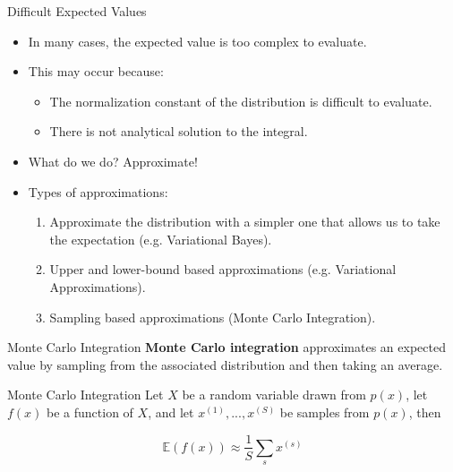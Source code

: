 \documentclass[serif,xcolor=pdftex,dvipsnames,table,hyperref={bookmarks=false,breaklinks}]{beamer}
\begin{document}
\begin{frame}[t]{Difficult Expected Values}
	\begin{itemize}[<+->]
		\item In many cases, the expected value is too complex to evaluate.
		\item This may occur because:
		\begin{itemize}[<+->]
			\item The normalization constant of the distribution is difficult to evaluate.
			\item There is not analytical solution to the integral.
		\end{itemize}
		\item What do we do? Approximate!
		\item Types of approximations:
		\begin{enumerate}[<+->]
			\item Approximate the distribution with a simpler one that allows us to take the expectation (e.g. Variational Bayes).
			\item Upper and lower-bound based approximations (e.g. Variational Approximations).
			\item Sampling based approximations (Monte Carlo Integration).
		\end{enumerate}
	\end{itemize}
\end{frame}

\begin{frame}[t]{Monte Carlo Integration}
	\textbf{Monte Carlo integration} approximates an expected value by sampling from the associated distribution and then taking an average.
	\pause
	\begin{block}{Monte Carlo Integration}
		Let $X$ be a random variable drawn from $p(x)$, let $f(x)$ be a function of $X$, and let $x^{(1)},...,x^{(S)}$ be samples from $p(x)$, then
		
		$$\mathbb{E}(f(x)) \approx \frac{1}{S}\sum_s x^{(s)}$$
	\end{block}
\end{frame}

%
%
%
\end{document}
